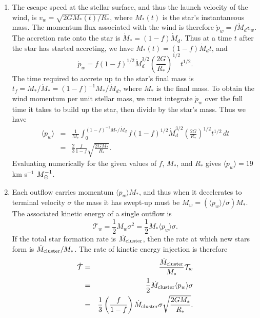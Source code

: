 \begin{enumerate}
\begin{enumerate}
\end{enumerate}

\begin{enumerate}

\item The escape speed at the stellar surface, and thus the launch velocity of the wind, is $v_w = \sqrt{2G M_*(t)/R_*}$, where $M_*(t)$ is the star's instantaneous mass. The momentum flux associated with the wind is therefore $\dot{p}_w = f \dot{M}_d v_w$. The accretion rate onto the star is $\dot{M}_* = (1-f) \dot{M}_d$. Thus at a time $t$ after the star has started accreting, we have $M_*(t) = (1-f) \dot{M}_d t$, and
\begin{displaymath}
\dot{p}_w = f (1-f)^{1/2} \dot{M}_d^{3/2} \left(\frac{2G}{R_*}\right)^{1/2} t^{1/2}.
\end{displaymath}
The time required to accrete up to the star's final mass is $t_f = M_*/\dot{M}_* = (1-f)^{-1} M_*/\dot{M}_d$, where $M_*$ is the final mass. To obtain the wind momentum per unit stellar mass, we must integrate $\dot{p}_w$ over the full time it takes to build up the star, then divide by the star's mass. Thus we have
\begin{eqnarray*}
\langle p_w\rangle & = & \frac{1}{M_*} \int_0^{(1-f)^{-1} M_*/\dot{M}_d} f (1-f)^{1/2} \dot{M}_d^{3/2} \left(\frac{2G}{R_*}\right)^{1/2} t^{1/2}\, dt \\
& = & \frac{2}{3} \frac{f}{1-f} \sqrt{\frac{2 G M_*}{R_*}}.
\end{eqnarray*}
Evaluating numerically for the given values of $f$, $M_*$, and $R_*$ gives $\langle p_w\rangle = 19$ km s$^{-1}$ $M_{\odot}^{-1}$.

\item Each outflow carries momentum $\langle p_w\rangle M_*$, and thus when it decelerates to terminal velocity $\sigma$ the mass it has swept-up must be $M_w = (\langle p_w\rangle/\sigma) M_*$. The associated kinetic energy of a single outflow is 
\begin{displaymath}
\mathcal{T}_w = \frac{1}{2} M_w \sigma^2 = \frac{1}{2} M_* \langle p_w\rangle \sigma.
\end{displaymath}
If the total star formation rate is $\dot{M}_{\rm cluster}$, then the rate at which new stars form is $\dot{M}_{\rm cluster}/M_*$. The rate of kinetic energy injection is therefore
\begin{eqnarray*}
\dot{\mathcal{T}} & = & \frac{\dot{M}_{\rm cluster}}{M_*} \mathcal{T}_w \\
& = & \frac{1}{2} \dot{M}_{\rm cluster} \langle p_w\rangle \sigma \\
& = & \frac{1}{3}\left(\frac{f}{1-f}\right) \dot{M}_{\rm cluster} \sigma \sqrt{\frac{2 G M_*}{R_*}}.
\end{eqnarray*}


\end{enumerate}
\end{enumerate}
